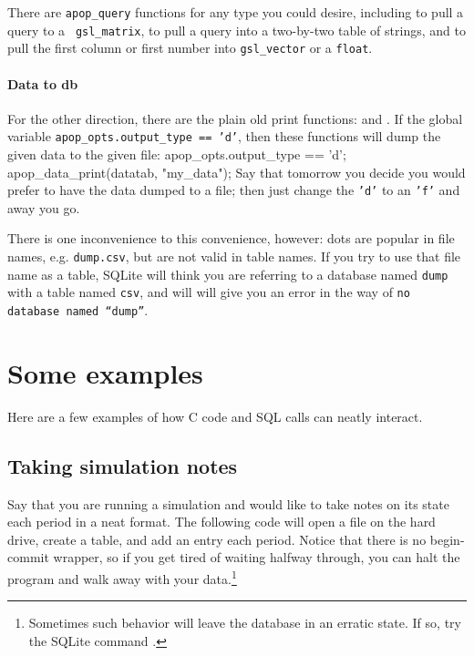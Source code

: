 There are {\tt apop\_query} functions for any type you could desire,
including  to pull a query to a {\tt
gsl\_matrix},  to pull a query into
a two-by-two table of strings, 
and  to pull the first column or first
number into {\tt gsl\_vector} or a {\tt float}.

\paragraph{Data to db} For the other direction, there are the plain old
print functions:  and
. If the global variable
{\tt apop\_opts.output\_type == 'd'}, then these functions will dump the
given data to the given file:
apop_opts.output_type == 'd';
apop_data_print(datatab, "my_data");
Say that tomorrow you decide you would prefer to have the data dumped to
a file; then just change the {\tt 'd'} to an {\tt 'f'} and away you go.

There is one inconvenience to this convenience, however: dots are popular
in file names, e.g. {\tt dump.csv}, but are not valid in table names. If
you try to use that file name as a table, SQLite will think you are
referring to a database named {\tt dump} with a table named {\tt csv},
and will will give you an error in the way of {\tt no database named ``dump''}.

\section{Some examples} 
Here are a few examples of how C code and SQL calls can neatly interact.

\subsection{Taking simulation notes}\label{createeg}
Say that you are running a simulation and would like to take notes on
its state each period in a neat format. The following code will open a
file on the hard drive, create a table, and add an entry each period.
Notice that there is no begin-commit wrapper, so if you get tired of
waiting halfway through, you can halt the program and walk away with
your data.\footnote{Sometimes such behavior will leave the database in
an erratic state. If so, try the SQLite command .}

